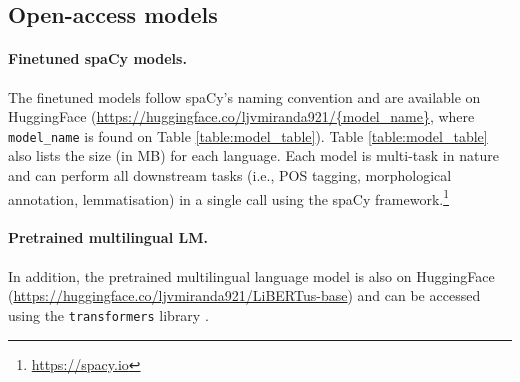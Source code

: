 \documentclass[11pt]{article}
\begin{document}
\subsection{Open-access models}

\paragraph{Finetuned spaCy models.} The finetuned models follow spaCy's naming convention and are available on HuggingFace (\url{https://huggingface.co/ljvmiranda921/{model\_name}}, where \texttt{model\_name} is found on Table \ref{table:model_table}).
Table \ref{table:model_table} also lists the size (in MB) for each language.
Each model is multi-task in nature and can perform all downstream tasks (i.e., POS tagging, morphological annotation, lemmatisation) in a single call using the spaCy framework.\footnote[3]{\url{https://spacy.io}}

\paragraph{Pretrained multilingual LM.}
In addition, the pretrained multilingual language model is also on HuggingFace (\url{https://huggingface.co/ljvmiranda921/LiBERTus-base}) and can be accessed using the \texttt{transformers} library \cite{wolf-etal-2020-transformers}.
\end{document}
